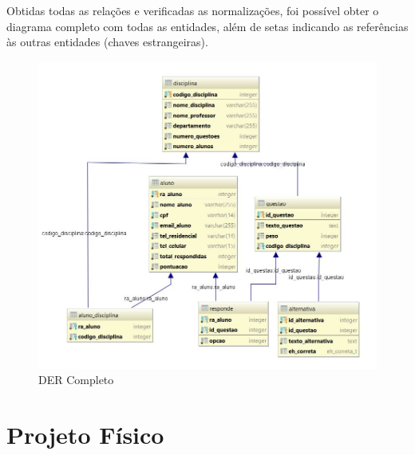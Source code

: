 \documentclass[12pt,a4paper]{article}
\begin{document}
Obtidas todas as relações e verificadas as normalizações, foi possível obter o diagrama completo com todas as entidades, além de setas indicando as referências às outras entidades (chaves estrangeiras).

\begin{center}
\begin{figure}[h]
    \centering
    \includegraphics[width=\linewidth]{mapeamento.jpg}
    \caption{DER Completo}
    \label{fig:DERcompleto}
\end{figure}
\end{center}

\section{Projeto Físico}
\end{document}
